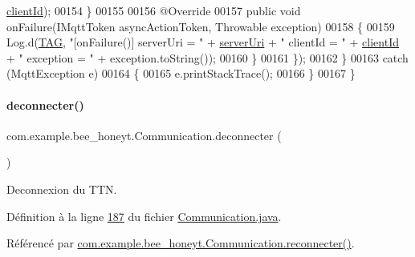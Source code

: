 \begin{DoxyCode}
      \hyperlink{classcom_1_1example_1_1bee__honeyt_1_1_communication_a8b44e0173d57396d5478f767723c23cc}{clientId});
00154                 \}
00155 
00156                 @Override
00157                 \textcolor{keyword}{public} \textcolor{keywordtype}{void} onFailure(IMqttToken asyncActionToken, Throwable exception)
00158                 \{
00159                     Log.d(\hyperlink{classcom_1_1example_1_1bee__honeyt_1_1_communication_a848338dd9654af654c7e681742666785}{TAG}, \textcolor{stringliteral}{"[onFailure()] serverUri = "} + \hyperlink{classcom_1_1example_1_1bee__honeyt_1_1_communication_a19b957478f8d8a0d8319e8459d85862e}{serverUri} + \textcolor{stringliteral}{" clientId = "} + 
      \hyperlink{classcom_1_1example_1_1bee__honeyt_1_1_communication_a8b44e0173d57396d5478f767723c23cc}{clientId} + \textcolor{stringliteral}{" exception = "} + exception.toString());
00160                 \}
00161             \});
00162         \}
00163         \textcolor{keywordflow}{catch} (MqttException e)
00164         \{
00165             e.printStackTrace();
00166         \}
00167     \}
\end{DoxyCode}
\mbox{\label{classcom_1_1example_1_1bee__honeyt_1_1_communication_a55454851f5e883b1539bd60fa7f4bfc6}} 
\paragraph{\texorpdfstring{deconnecter()}{deconnecter()}}
{\footnotesize\ttfamily com.\+example.\+bee\+\_\+honeyt.\+Communication.\+deconnecter (\begin{DoxyParamCaption}{ }\end{DoxyParamCaption})}



Deconnexion du T\+TN. 



Définition à la ligne \hyperlink{_communication_8java_source_l00187}{187} du fichier \hyperlink{_communication_8java_source}{Communication.\+java}.



Référencé par \hyperlink{_communication_8java_source_l00174}{com.\+example.\+bee\+\_\+honeyt.\+Communication.\+reconnecter()}.


